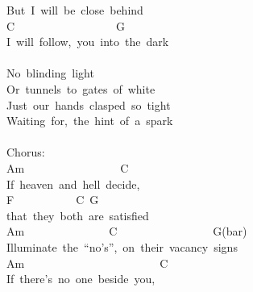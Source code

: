 \documentclass[]{book}
\begin{document}
But~I~will~be~close~behind\\
\hspace*{0.333em}\hspace*{0.333em}\hspace*{0.333em}\hspace*{0.333em}\hspace*{0.333em}\hspace*{0.333em}\hspace*{0.333em}\hspace*{0.333em}\hspace*{0.333em}\hspace*{0.333em}\hspace*{0.333em}C~~~~~~~~~~~~~~~~~~G\\
I~will~follow,~you~into~the~dark\\
~\\
No~blinding~light\\
Or~tunnels~to~gates~of~white\\
Just~our~hands~clasped~so~tight\\
Waiting~for,~the~hint~of~a~spark~\\
~\\
Chorus:~\\
\hspace*{0.333em}\hspace*{0.333em}\hspace*{0.333em}Am~~~~~~~~~~~~~~~~~C~~~~~~\\
If~heaven~and~hell~decide,~~~~~~\\
\hspace*{0.333em}\hspace*{0.333em}\hspace*{0.333em}\hspace*{0.333em}\hspace*{0.333em}\hspace*{0.333em}\hspace*{0.333em}\hspace*{0.333em}\hspace*{0.333em}\hspace*{0.333em}\hspace*{0.333em}F~~~~~~~~~~~C~G\\
that~they~both~are~satisfied\\
Am~~~~~~~~~~~~~~~C~~~~~~~~~~~~~~~~~G(bar)\\
Illuminate~the~``no's'',~on~their~vacancy~signs\\
Am~~~~~~~~~~~~~~~~~~~~~~~~C\\
If~there's~no~one~beside~you,\\
\end{document}
